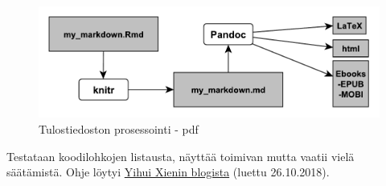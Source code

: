 \documentclass[finnish,]{book}
\begin{document}
\begin{figure}

{\centering \includegraphics[width=0.5\linewidth]{BookdownProc} 

}

\caption{Tulostiedoston prosessointi - pdf}\label{fig:bdprocess2}
\end{figure}

Testataan koodilohkojen listausta, näyttää toimivan mutta vaatii vielä säätämistä. Ohje löytyi \href{https://yihui.name/en/2018/09/code-appendix/}{Yihui Xienin blogista} (luettu 26.10.2018).
\end{document}
